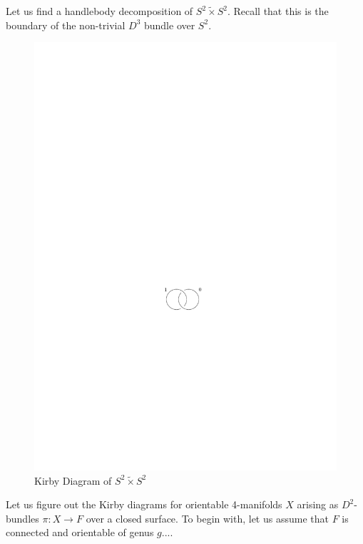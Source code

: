 \begin{example}
Let us find a handlebody decomposition of $S^2 \tilde\times S^2$. Recall that this is the boundary of the non-trivial $D^3$ bundle over $S^2$.

\begin{figure}[tb]
\centering
\includegraphics[scale=1]{graphics/kirby-diagram-twisted-s2xs2}
\caption{Kirby Diagram of $S^2 \tilde\times S^2$}
\label{kirby-diagram-twisted-s2xs2}
\end{figure}
\end{example}



\begin{example}
Let us figure out the Kirby diagrams for orientable 4-manifolds $X$ arising as $D^2$-bundles $\pi : X \rightarrow F$ over a closed surface. To begin with, let us assume that $F$ is connected and orientable of genus $g$.... \unfinished
\end{example}












